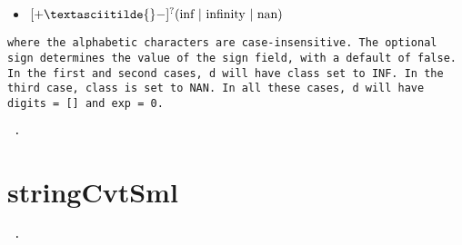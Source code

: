 \documentclass[11pt]{report}
\begin{document}
\begin{itemize}
\begin{itemize}
\begin{flushleft}
\begin{itemize}
\item $[+ \textasciitilde{} -]^?(\text{inf | infinity | nan})$
\end{itemize}

\texttt{where the alphabetic characters are case-insensitive. The optional sign determines the value of the sign field, with a default of false. In the first and second cases, d will have class set to INF. In the third case, class is set to NAN. In all these cases, d will have digits = [] and exp = 0. } \end{flushleft}

\end{itemize}

\end{itemize}




\begin{coqdoccode}
\coqdocemptyline
\coqdocemptyline
\coqdocnoindent
\texttt{ .\coqdoceol}
\end{coqdoccode}
\section*{stringCvtSml}

\begin{coqdoccode}
\coqdocemptyline
\coqdocnoindent
\texttt{ .\coqdoceol}
\coqdocemptyline
\end{coqdoccode}
\end{document}
